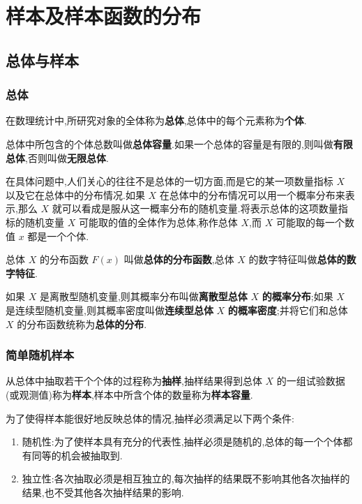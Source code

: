 
\chapter{样本及样本函数的分布}

\section{总体与样本}

\subsection{总体}

在数理统计中,所研究对象的全体称为\textbf{总体},总体中的每个元素称为\textbf{个体}.

总体中所包含的个体总数叫做\textbf{总体容量}.如果一个总体的容量是有限的,则叫做\textbf{有限总体},否则叫做\textbf{无限总体}.

在具体问题中,人们关心的往往不是总体的一切方面,而是它的某一项数量指标 $X$ 以及它在总体中的分布情况.如果 $X$ 在总体中的分布情况可以用一个概率分布来表示,那么 $X$ 就可以看成是服从这一概率分布的随机变量.将表示总体的这项数量指标的随机变量 $X$ 可能取的值的全体作为总体,称作总体 $X$,而 $X$ 可能取的每一个数值 $x$ 都是一个个体.

总体 $X$ 的分布函数 $F(x)$ 叫做\textbf{总体的分布函数},总体 $X$ 的数字特征叫做\textbf{总体的数字特征}.

如果 $X$ 是离散型随机变量,则其概率分布叫做\textbf{离散型总体} $X$ \textbf{的概率分布};如果 $X$ 是连续型随机变量,则其概率密度叫做\textbf{连续型总体} $X$ \textbf{的概率密度};并将它们和总体 $X$ 的分布函数统称为\textbf{总体的分布}.

\subsection{简单随机样本}

从总体中抽取若干个个体的过程称为\textbf{抽样},抽样结果得到总体 $X$ 的一组试验数据(或观测值)称为\textbf{样本},样本中所含个体的数量称为\textbf{样本容量}.

为了使得样本能很好地反映总体的情况,抽样必须满足以下两个条件:
\begin{enumerate}
    \item 随机性:为了使样本具有充分的代表性,抽样必须是随机的,总体的每一个个体都有同等的机会被抽取到.
    \item 独立性:各次抽取必须是相互独立的,每次抽样的结果既不影响其他各次抽样的结果,也不受其他各次抽样结果的影响.
\end{enumerate}

